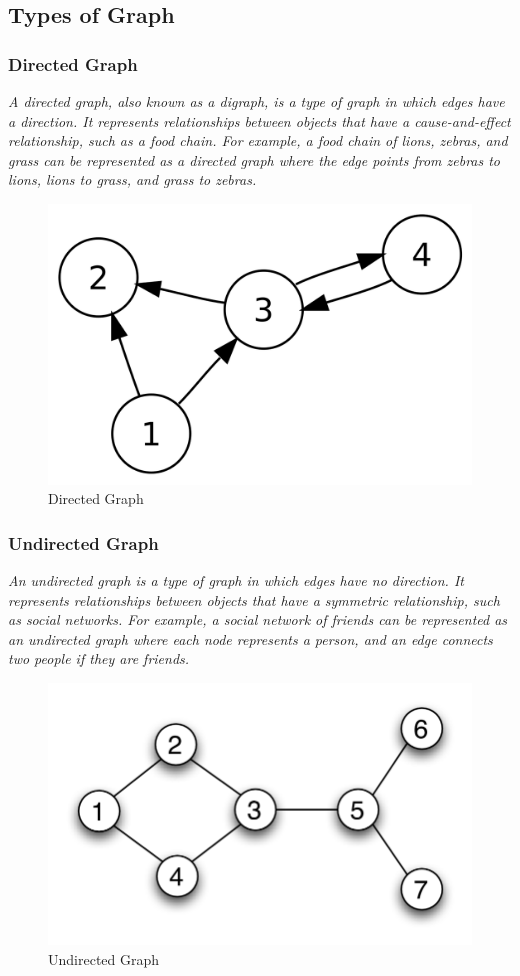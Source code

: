 \documentclass[11pt]{article}
\begin{document}
\subsection{Types of Graph}
\subsubsection{Directed Graph}
\textit{A directed graph, also known as a digraph, is a type of graph in which edges have a direction. It represents relationships between objects that have a cause-and-effect relationship, such as a food chain. For example, a food chain of lions, zebras, and grass can be represented as a directed graph where the edge points from zebras to lions, lions to grass, and grass to zebras.}

\begin{figure}[H]
    \centering
    \includegraphics[width=.45\textwidth]{figures/directed graph.png}
    \caption{Directed Graph}
\end{figure}

\subsubsection{Undirected Graph}

\textit{An undirected graph is a type of graph in which edges have no direction. It represents relationships between objects that have a symmetric relationship, such as social networks. For example, a social network of friends can be represented as an undirected graph where each node represents a person, and an edge connects two people if they are friends.}

\begin{figure}[H]
    \centering
    \includegraphics[width=.45\textwidth]{figures/undirected graph.png}
    \caption{Undirected Graph}
\end{figure}
\end{document}
